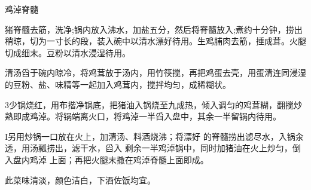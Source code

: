 \begin{recipe}{鸡淖脊髓}

\ingredients


\cooking

\step 猪脊髓去筋，洗净;锅内放入沸水，加盐五分，然后将脊髓放入;煮约十分钟，捞出稍晾，切为一寸长的段，装入碗中以清水漂好待用。生鸡脯肉去筋，捶成茸。火腿切成细末。豆粉以清水浸湿待用。

\step 清汤舀于碗内晾冷，将鸡茸放于汤内，用竹筷搅，再把鸡蛋去壳，用蛋清连同浸湿的豆粉、盐、味精等一起加入鸡茸内，搅拌均匀，成稀糊状。

\step 3少锅烧红，用布揩净锅底，把猪油入锅烧至九成热，倾入调匀的鸡茸糊，翻搅炒熟即成鸡淖。将锅端离火口，将鸡淖一半舀入盘中，其余一半留锅内待用。

I另用炒锅一口放在火上，加清汤、料酒烧沸；将漂好 的脊髓捞出滤尽水，入锅汆透，用汤瓢捞出，滤干水，舀入 剩余一半鸡淖锅中，同时加猪油在火上炒匀，倒入盘内鸡淖 上面；再把火腿末撒在鸡淖脊髓上面即成。

\notes

此菜味清淡，颜色洁白，下酒佐饭均宜。

\end{recipe}

